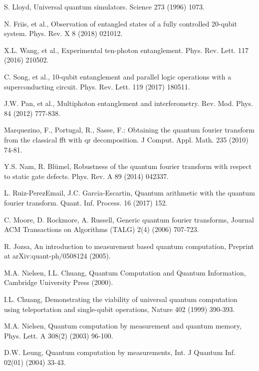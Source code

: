 \documentclass[aps,pra,showpacs,twocolumn,superscriptaddress]{revtex4-1}
\begin{document}
\begin{thebibliography}{10}
S. Lloyd, Universal quantum simulators. Science 273 (1996) 1073.

N. Friis, et al., Observation of entangled states of a fully controlled 20-qubit system. Phys. Rev. X 8 (2018) 021012.

X.L. Wang, et al., Experimental ten-photon entanglement. Phys. Rev. Lett. 117 (2016) 210502.

C. Song, et al., 10-qubit entanglement and parallel logic operations with a superconducting circuit. Phys. Rev. Lett. 119 (2017) 180511.

J.W. Pan, et al., Multiphoton entanglement and interferometry. Rev. Mod. Phys. 84 (2012) 777-838.

Marquezino, F., Portugal, R., Sasse, F.: Obtaining the quantum fourier transform from the classical fft with qr decomposition. J Comput. Appl. Math. 235 (2010) 74-81.

Y.S. Nam, R. Bl\"umel, Robustness of the quantum fourier transform with respect to static gate defects. Phys. Rev. A 89 (2014) 042337.

L. Ruiz-PerezEmail, J.C. Garcia-Escartin, Quantum arithmetic with the quantum fourier transform. Quant. Inf. Process. 16 (2017) 152.

C. Moore, D. Rockmore, A. Russell, Generic quantum fourier transforms, Journal ACM Transactions on Algorithms (TALG) 2(4) (2006) 707-723.

R. Jozsa, An introduction to measurement based quantum computation, Preprint at arXiv:quant-ph/0508124 (2005).

M.A. Nielsen, I.L. Chuang, Quantum Computation and Quantum Information, Cambridge University Press (2000).

I.L. Chuang, Demonstrating the viability of universal quantum computation using teleportation and single-qubit operations, Nature 402 (1999) 390-393.

M.A. Nielsen, Quantum computation by measurement and quantum memory, Phys. Lett. A 308(2) (2003) 96-100.

D.W. Leung, Quantum computation by measurements, Int. J Quantum Inf. 02(01) (2004) 33-43.
\end{thebibliography}
\end{document}
